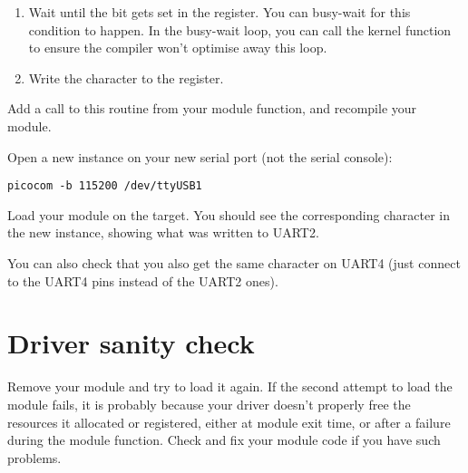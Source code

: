 \begin{enumerate}
\item Wait until the  bit gets set in the
   register.  You can busy-wait for this condition to happen.
  In the busy-wait loop, you can call the  kernel function
  to ensure the compiler won't optimise away this loop.
\item Write the character to the  register.
\end{enumerate}

Add a call to this routine from your module  function,
and recompile your module.

Open a new  instance on your new serial port (not the
serial console):

\begin{verbatim}
picocom -b 115200 /dev/ttyUSB1
\end{verbatim}

Load your module on the target. You should see the
corresponding character in the new  instance,
showing what was written to UART2.

You can also check that you also get the same character on UART4
(just connect to the UART4 pins instead of the UART2 ones).

\section{Driver sanity check}

Remove your module and try to load it again. If the second attempt to
load the module fails, it is probably because your driver doesn't
properly free the resources it allocated or registered, either at module
exit time, or after a failure during the module  function. Check
and fix your module code if you have such problems.
